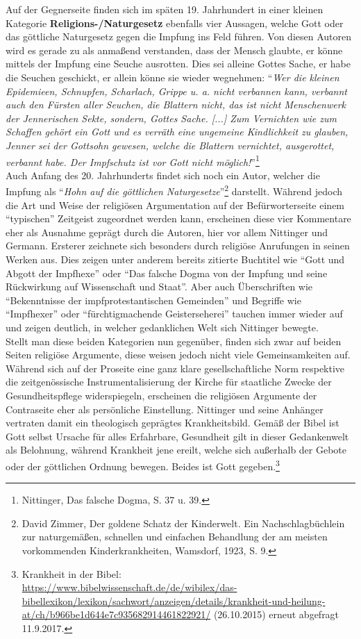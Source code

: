 \documentclass[
    a4paper,
    12pt,
    hyphens,
    chapterprefix=true,
    headheight=33pt,
    footheight=29pt,
    headings=optiontohead, %
]{scrartcl}
\begin{document}
{Auf der Gegnerseite finden sich im späten 19. Jahrhundert in einer kleinen Kategorie \textbf{Religions-/Naturgesetz} ebenfalls vier Aussagen, welche Gott oder das göttliche Naturgesetz gegen die Impfung ins Feld führen. Von diesen Autoren wird es gerade zu als anmaßend verstanden, dass der Mensch glaubte, er könne mittels der Impfung eine Seuche ausrotten. Dies sei alleine Gottes Sache, er habe die Seuchen geschickt, er allein könne sie wieder wegnehmen: "`\textit{Wer die kleinen Epidemieen, Schnupfen, Scharlach, Grippe u. a. nicht verbannen kann, verbannt auch den Fürsten aller Seuchen, die Blattern nicht, das ist nicht Menschenwerk der Jennerischen Sekte, sondern, Gottes Sache. [...] Zum Vernichten wie zum Schaffen gehört ein Gott und es verräth eine ungemeine Kindlichkeit zu glauben, Jenner sei der Gottsohn gewesen, welche die Blattern vernichtet, ausgerottet, verbannt habe. Der Impfschutz ist vor Gott nicht möglich!}"'\footnote{Nittinger, Das falsche Dogma, S. 37 u. 39.}\\
Auch Anfang des 20. Jahrhunderts findet sich noch ein Autor, welcher die Impfung als "`\textit{Hohn auf die göttlichen Naturgesetze}"'\footnote{David Zimmer, Der goldene Schatz der Kinderwelt. Ein Nachschlagbüchlein zur naturgemäßen, schnellen und einfachen Behandlung der am meisten vorkommenden Kinderkrankheiten, Wamsdorf, 1923, S. 9. } darstellt. Während jedoch die Art und Weise der religiösen Argumentation auf der Befürworterseite einem "`typischen"' Zeitgeist zugeordnet werden kann, erscheinen diese vier Kommentare eher als Ausnahme geprägt durch die Autoren, hier vor allem Nittinger und Germann. Ersterer zeichnete sich besonders durch religiöse Anrufungen in seinen Werken aus. Dies zeigen unter anderem bereits zitierte Buchtitel wie "`Gott und Abgott der Impfhexe"' oder "`Das falsche Dogma von der Impfung und seine Rückwirkung auf Wissenschaft und Staat"'. Aber auch Überschriften wie "`Bekenntnisse der impfprotestantischen Gemeinden"' und Begriffe wie "`Impfhexer"' oder "`fürchtigmachende Geisterseherei"' tauchen immer wieder auf und zeigen deutlich, in welcher gedanklichen Welt sich Nittinger bewegte.\\
Stellt man diese beiden Kategorien nun gegenüber, finden sich zwar auf beiden Seiten religiöse Argumente, diese weisen jedoch nicht viele Gemeinsamkeiten auf. Während sich auf der Proseite eine ganz klare gesellschaftliche Norm respektive die zeitgenössische Instrumentalisierung der Kirche für staatliche Zwecke der Gesundheitspflege widerspiegeln, erscheinen die religiösen Argumente der Contraseite eher als persönliche Einstellung. Nittinger und seine Anhänger vertraten damit ein theologisch geprägtes Krankheitsbild. Gemäß der Bibel ist Gott selbst Ursache für alles Erfahrbare, Gesundheit gilt in dieser Gedankenwelt als Belohnung, während Krankheit jene ereilt, welche sich außerhalb der Gebote oder der göttlichen Ordnung bewegen. Beides ist Gott gegeben.\footnote{Krankheit in der Bibel:\\ \url{https://www.bibelwissenschaft.de/de/wibilex/das-bibellexikon/lexikon/sachwort/anzeigen/details/krankheit-und-heilung-at/ch/b966be1d644e7c935682914461822921/} (26.10.2015) erneut abgefragt 11.9.2017.}
}
\end{document}
